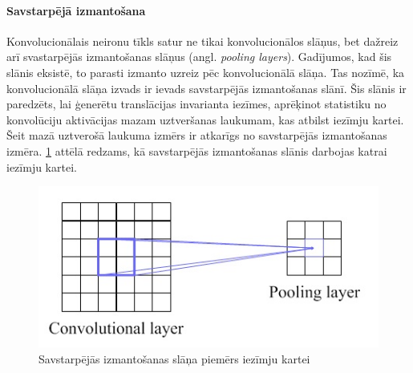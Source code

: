 \documentclass[12pt,paper=a4]{report}
\begin{document}
\paragraph{Savstarpējā izmantošana} Konvolucionālais neironu tīkls satur ne tikai konvolucionālos slāņus, bet dažreiz arī svastarpējās izmantošanas slāņus (angl. \textit{pooling layers}). Gadījumos, kad šis slānis eksistē, to parasti izmanto uzreiz pēc konvolucionālā slāņa. Tas nozīmē, ka konvolucionālā slāņa izvads ir ievads savstarpējās izmantošanas slānī. Šis slānis ir paredzēts, lai ģenerētu translācijas invarianta iezīmes, aprēķinot statistiku no konvolūciju aktivācijas mazam uztveršanas laukumam, kas atbilst iezīmju kartei. Šeit mazā uztverošā laukuma izmērs ir atkarīgs no savstarpējās izmantošanas izmēra. \ref{fig:pooling3} attēlā redzams, kā savstarpējās izmantošanas slānis darbojas katrai iezīmju kartei.\cite{convolutionalNN}
\begin{figure}[h!]
\centering
\includegraphics[width=.6\linewidth]{pooling}
\caption{Savstarpējās izmantošanas slāņa piemērs iezīmju kartei \cite{convolutionalNN}}
\label{fig:pooling3}
\end{figure}
\end{document}
